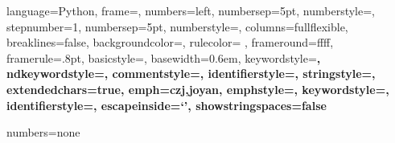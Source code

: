 

\usepackage{listings} %



\lstset %
{language=Python,
frame=\leftline\shadowbox,
numbers=left,
numbersep=5pt,
numberstyle=\ttfamily\footnotesize\color{gray},
stepnumber=1,
numbersep=5pt,
numberstyle=\color[RGB]{80,192,192},
columns=fullflexible,
breaklines=false,  %
backgroundcolor=\color{black!10!white},
rulecolor= \color{gray},
frameround=ffff,
framerule=.8pt,  %
basicstyle=\linespread{1.1}\ttfamily\footnotesize, %
basewidth=0.6em,
keywordstyle=\ttfamily\bf\color{colorKeyword},
ndkeywordstyle=\ttfamily\bf\color{colorNdkeyword},
commentstyle=\color{colorComment},
identifierstyle=\ttfamily\color{colorIdentifier}\bfseries,
stringstyle=\color{colorString}\ttfamily,
extendedchars=true,
emph={czj,joyan},
emphstyle=\color{blue}\bfseries,
keywordstyle=\color{blue}\bfseries,
identifierstyle=\color{black}, %
escapeinside=`',
showstringspaces=false
}



 {numbers=none}







